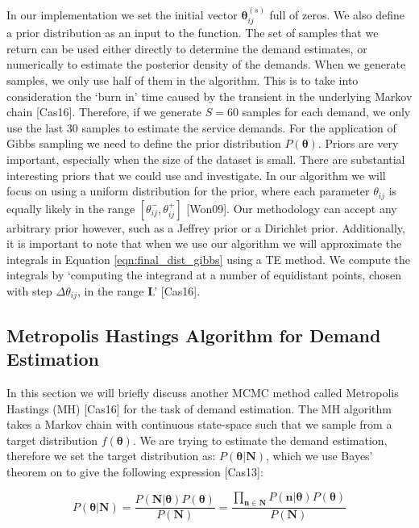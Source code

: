 \documentclass[a4paper,11pt,titlepage]{article}
\begin{document}
In our implementation we set the initial vector $\bm{\theta}_{ij}^{(s)}$ full of zeros. We also define a prior distribution as an input to the function. The set of samples that we return can be used either directly to determine the demand estimates, or numerically to estimate the posterior density of the demands. When we generate samples, we only use half of them in the algorithm. This is to take into consideration the `burn in' time caused by the transient in the underlying Markov chain [Cas16]. Therefore, if we generate $S=60$ samples for each demand, we only use the last 30 samples to estimate the service demands. For the application of Gibbs sampling we need to define the prior distribution $P(\bm{\theta})$. Priors are very important, especially when the size of the dataset is small. There are substantial interesting priors that we could use and investigate. In our algorithm we will focus on using a uniform distribution for the prior, where each parameter $\theta_{ij}$ is equally likely in the range $[\theta_{ij}^{-}, \theta_{ij}^{+}]$ [Won09]. Our methodology can accept any arbitrary prior however, such as a Jeffrey prior or a Dirichlet prior. Additionally, it is important to note that when we use our algorithm we will approximate the integrals in Equation \ref{eqn:final_dist_gibbs} using a TE method. We compute the integrals by `computing the integrand at a number of equidistant points, chosen with step $\Delta \theta_{ij}$, in the range $\mathbf{I}$.' [Cas16].

\subsection{Metropolis Hastings Algorithm for Demand Estimation}

In this section we will briefly discuss another MCMC method called Metropolis Hastings (MH) [Cas16] for the task of demand estimation. The MH algorithm takes a Markov chain with continuous state-space such that we sample from a target distribution $f(\bm{\theta})$. We are trying to estimate the demand estimation, therefore we set the target distribution as: $P(\bm{\theta}|\mathbf{N})$, which we use Bayes' theorem on to give the following expression [Cas13]:

\begin{equation}
    P(\bm{\theta}|\mathbf{N}) = \frac{P(\mathbf{N}|\bm{\theta}) P(\bm{\theta})}{P(\mathbf{N})} = \frac{\prod_{\mathbf{n} \in \mathbf{N}} P(\mathbf{n} | \bm{\theta}) P(\bm{\theta})}{P(\mathbf{N})}
    \label{eqn:bayes_MH}
\end{equation}
\end{document}

